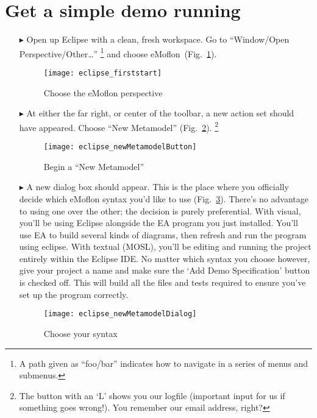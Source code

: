 \newpage
\genHeader

\section{Get a simple demo running}


\begin{itemize}
\item[$\blacktriangleright$] Open\hypertarget{simpleDemo common}{} up Eclipse with a clean, fresh workspace. Go to ``Window/Open Perspective/Other\ldots''
\footnote{A path given as ``foo/bar'' indicates how to navigate in a series of menus and submenus.} and choose eMoflon~(Fig.~\ref{fig_eclipse}).

\begin{figure}[htbp]
	\centering
  \texttt{[image: eclipse\_firststart]}
	\caption{Choose the eMoflon perspective}
	\label{fig_eclipse}
\end{figure} 

\item[$\blacktriangleright$] At either the far right, or center of the toolbar, a new action set should have appeared. Choose ``New Metamodel''
(Fig.~\ref{fig_eclipseNewMetamodelButton}).
\footnote{The button with an `L' shows you our logfile (important input for us if something goes wrong!). You remember our email address, right?}

\begin{figure}[htbp]
	\centering
  \texttt{[image: eclipse\_newMetamodelButton]}
	\caption{Begin a ``New Metamodel''}
	\label{fig_eclipseNewMetamodelButton}
\end{figure}

\item[$\blacktriangleright$] A new dialog box should appear. This is the place where you officially decide which eMoflon syntax you'd like to use
(Fig.~\ref{fig_chooseSyntax}). There's no advantage to using one over the other; the decision is purely preferential. With visual, you'll be using Eclipse
alongside the EA program you just installed. You'll use EA to build several kinds of diagrams, then refresh and run the program using eclipse. With textual
(MOSL), you'll be editing and running the project entirely within the Eclipse IDE. No matter which syntax you choose however, give your project a name and make
sure the `Add Demo Specification' button is checked off. This will build all the files and tests required to ensure you've set up the program correctly.

\vspace{1cm}

\begin{figure}[htbp]
	\centering
  \texttt{[image: eclipse\_newMetamodelDialog]}
	\caption{Choose your syntax}
	\label{fig_chooseSyntax}
\end{figure} 
\end{itemize}



